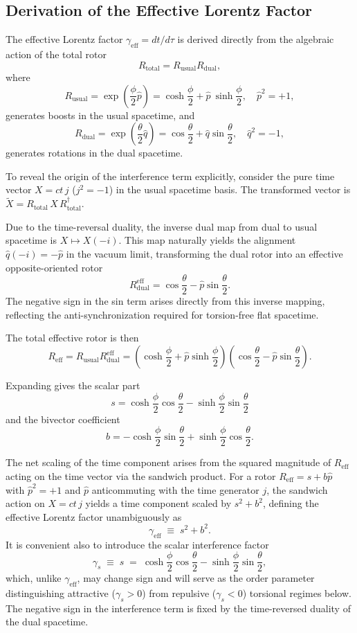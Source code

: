 \documentclass[a4paper]{article}
\begin{document}
\subsection{Derivation of the Effective Lorentz Factor}

The effective Lorentz factor $\gamma_\text{eff} = dt/d\tau$ is derived directly from the algebraic action of the total rotor
\[
R_\text{total} = R_\text{usual} R_\text{dual},
\]
where
\[
R_\text{usual} = \exp\!\left(\frac{\phi}{2} \hat{p}\right) = \cosh\frac{\phi}{2} + \hat{p}\: \sinh\frac{\phi}{2}, \quad \hat{p}^2 = +1,
\]
generates boosts in the usual spacetime, and
\[
R_\text{dual} = \exp\!\left(\frac{\theta}{2} \hat{q}\right) = \cos\frac{\theta}{2} + \hat{q} \sin\frac{\theta}{2}, \quad \hat{q}^2 = -1,
\]
generates rotations in the dual spacetime.

To reveal the origin of the interference term explicitly, consider the pure time vector $X = ct \, j$ ($j^2 = -1$) in the usual spacetime basis. The transformed vector is $\tilde{X} = R_\text{total} \, X \, R_\text{total}^\dagger$.

Due to the time-reversal duality, the inverse dual map from dual to usual spacetime is $X \mapsto X(-i)$. This map naturally yields the alignment $\hat{q} (-i) = -\hat{p}$ in the vacuum limit, transforming the dual rotor into an effective opposite-oriented rotor
\[
R_\text{dual}^\text{eff} = \cos\frac{\theta}{2} - \hat{p} \sin\frac{\theta}{2}.
\]
The negative sign in the sin term arises directly from this inverse mapping, reflecting the anti-syn\-chro\-ni\-za\-tion required for torsion-free flat spacetime.

The total effective rotor is then
\[
R_\text{eff} = R_\text{usual} R_\text{dual}^\text{eff} = \left( \cosh\frac{\phi}{2} + \hat{p} \sinh\frac{\phi}{2} \right) \left( \cos\frac{\theta}{2} - \hat{p} \sin\frac{\theta}{2} \right).
\]

Expanding gives the scalar part
\[
s = \cosh\frac{\phi}{2} \cos\frac{\theta}{2} - \sinh\frac{\phi}{2} \sin\frac{\theta}{2}
\]
and the bivector coefficient
\[
b = -\cosh\frac{\phi}{2} \sin\frac{\theta}{2} + \sinh\frac{\phi}{2} \cos\frac{\theta}{2}.
\]

The net scaling of the time component arises from the squared magnitude of $R_\text{eff}$ acting on the time vector via the sandwich product. For a rotor $R_\text{eff} = s + b\hat{p}$ with $\hat{p}^2 = +1$ and $\hat{p}$ anticommuting with the time generator $j$, the sandwich action on $X = ct\, j$ yields a time component scaled by $s^2 + b^2$, defining the effective Lorentz factor unambiguously as
\[
\gamma_\text{eff} \;\equiv\; s^2 + b^2.
\]
It is convenient also to introduce the scalar interference factor
\[
\gamma_s \;\equiv\; s \;=\; \cosh\frac{\phi}{2} \cos\frac{\theta}{2} - \sinh\frac{\phi}{2} \sin\frac{\theta}{2},
\]
which, unlike $\gamma_\text{eff}$, may change sign and will serve as the order parameter distinguishing attractive ($\gamma_s > 0$) from repulsive ($\gamma_s < 0$) torsional regimes below. The negative sign in the interference term is fixed by the time-reversed duality of the dual spacetime.
\end{document}
